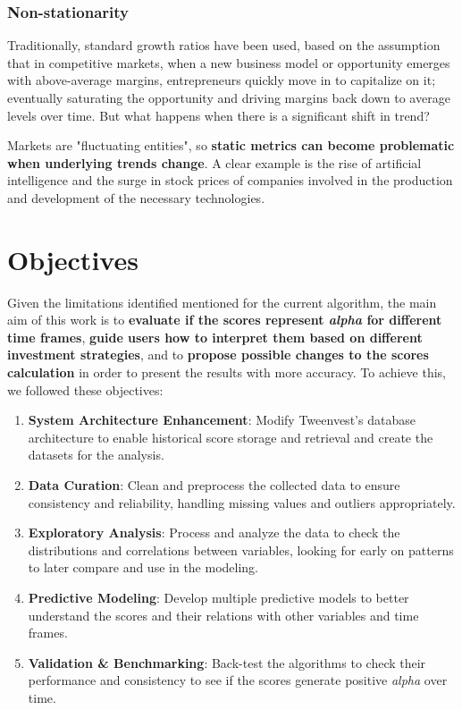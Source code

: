 \documentclass[11pt,english,a4paper,hidelinks]{book}
\begin{document}
\subsubsection{Non-stationarity}

\noindent Traditionally, standard growth ratios have been used, based on the assumption that in competitive markets, when a new business model or opportunity emerges with above-average margins, entrepreneurs quickly move in to capitalize on it; eventually saturating the opportunity and driving margins back down to average levels over time. But what happens when there is a significant shift in trend? 

\vspace{0.5cm}
\noindent Markets are "fluctuating entities", so \textbf{static metrics can become problematic when underlying trends change}. A clear example is the rise of artificial intelligence and the surge in stock prices of companies involved in the production and development of the necessary technologies.

\section{Objectives}

\noindent Given the limitations identified mentioned for the current algorithm, the main aim of this work is to \textbf{evaluate if the scores represent \textit{alpha} for different time frames}, \textbf{guide users how to interpret them based on different investment strategies}, and to \textbf{propose possible changes to the scores calculation} in order to present the results with more accuracy. To achieve this, we followed these objectives:

\begin{enumerate}
  \item \textbf{System Architecture Enhancement}: Modify Tweenvest's database architecture to enable historical score storage and retrieval and create the datasets for the analysis.
  \item \textbf{Data Curation}: Clean and preprocess the collected data to ensure consistency and reliability, handling missing values and outliers appropriately.
  \item \textbf{Exploratory Analysis}: Process and analyze the data to check the distributions and correlations between variables, looking for early on patterns to later compare and use in the modeling.
  \item \textbf{Predictive Modeling}: Develop multiple predictive models to better understand the scores and their relations with other variables and time frames.
  \item \textbf{Validation \& Benchmarking}: Back-test the algorithms to check their performance and consistency to see if the scores generate positive \textit{alpha} over time.
\end{enumerate}
\end{document}
